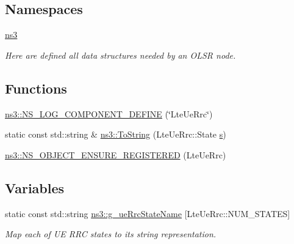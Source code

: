 \subsection*{Namespaces}
\begin{DoxyCompactItemize}
\item 
 \hyperlink{namespacens3}{ns3}
\begin{DoxyCompactList}\small\item\em Here are defined all data structures needed by an O\+L\+SR node. \end{DoxyCompactList}\end{DoxyCompactItemize}
\subsection*{Functions}
\begin{DoxyCompactItemize}
\item 
\hyperlink{namespacens3_a9de236d5d3c010b7093cc638820e5a44}{ns3\+::\+N\+S\+\_\+\+L\+O\+G\+\_\+\+C\+O\+M\+P\+O\+N\+E\+N\+T\+\_\+\+D\+E\+F\+I\+NE} (\char`\"{}Lte\+Ue\+Rrc\char`\"{})
\item 
static const std\+::string \& \hyperlink{namespacens3_a9631fbf358c3338b98504943a65bf83d}{ns3\+::\+To\+String} (Lte\+Ue\+Rrc\+::\+State \hyperlink{generate__test__data__lte__sinr_8m_ad83eeb3a142285d1243a08c6b7026df8}{s})
\item 
\hyperlink{namespacens3_a6476e5fc6d3e19f78729aa0364d082f1}{ns3\+::\+N\+S\+\_\+\+O\+B\+J\+E\+C\+T\+\_\+\+E\+N\+S\+U\+R\+E\+\_\+\+R\+E\+G\+I\+S\+T\+E\+R\+ED} (Lte\+Ue\+Rrc)
\end{DoxyCompactItemize}
\subsection*{Variables}
\begin{DoxyCompactItemize}
\item 
static const std\+::string \hyperlink{namespacens3_a4fd758b59380ce114f5dd1a241b1321e}{ns3\+::g\+\_\+ue\+Rrc\+State\+Name} \mbox{[}Lte\+Ue\+Rrc\+::\+N\+U\+M\+\_\+\+S\+T\+A\+T\+ES\mbox{]}
\begin{DoxyCompactList}\small\item\em Map each of UE R\+RC states to its string representation. \end{DoxyCompactList}\end{DoxyCompactItemize}
